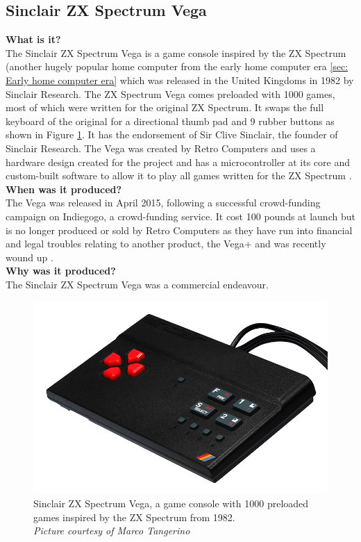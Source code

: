 \subsection{Sinclair ZX Spectrum Vega}
\textbf{What is it?}\\
The Sinclair ZX Spectrum Vega is a game console inspired by the ZX Spectrum (another hugely popular home computer from the early home computer era \ref{sec: Early home computer era} which was released in the United Kingdoms in 1982 by Sinclair Research. The ZX Spectrum Vega comes preloaded with 1000 games, most of which were written for the original ZX Spectrum. It swaps the full keyboard of the original for a directional thumb pad and 9 rubber buttons as shown in Figure \ref{Spectrum_Vega}. It has the endorsement of Sir Clive Sinclair, the founder of Sinclair Research. The Vega was created by Retro Computers and uses a hardware design created for the project and has a microcontroller at its core and custom-built software to allow it to play all games written for the ZX Spectrum 
\cite{RN119}.\\

\textbf{When was it produced?}\\
The Vega was released in April 2015, following a successful crowd-funding campaign on Indiegogo, a crowd-funding service. It cost 100 pounds at launch but is no longer produced or sold by Retro Computers as they have run into financial and legal troubles relating to another product, the Vega+ and was recently wound up 
\cite{RN120}.  \\

\textbf{Why was it produced?}\\
The Sinclair ZX Spectrum Vega was a commercial endeavour. \\

\begin{figure} \begin{center}
\includegraphics[width=.3\linewidth]{pics/Spectrum_Vega} 
\end{center} 
\caption{Sinclair ZX Spectrum Vega, a game console with 1000 preloaded games inspired by the ZX Spectrum from 1982. \\ \textit{\small{Picture courtesy of Marco Tangerino}}}
\label{Spectrum_Vega}
\end{figure} 

